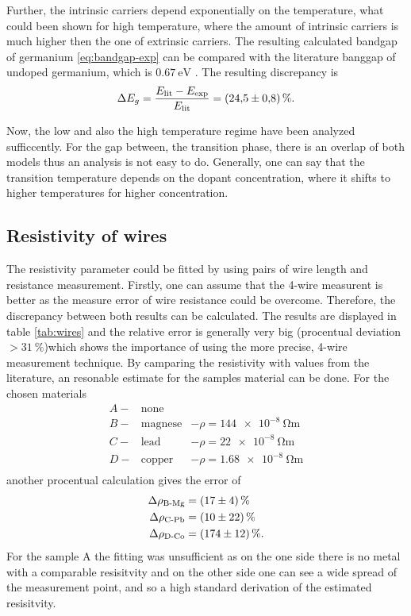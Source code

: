 Further, the intrinsic carriers depend exponentially on the temperature, what could been shown for high temperature, where the amount of intrinsic carriers is much higher then the one of extrinsic carriers.
The resulting calculated bandgap of germanium \ref{eq:bandgap-exp} can be compared with the literature banggap of undoped germanium, which is $\SI{0.67}{\eV}$ \cite{bandgap-Ge}.
The resulting discrepancy is
\begin{equation}
    \Delta E_g = \frac{E_\text{lit}-E_\text{exp}}{E_\text{lit}} = \SI{24.5 \pm 0.8}{\percent}.
\end{equation}

Now, the low and also the high temperature regime have been analyzed sufficcently. 
For the gap between, the transition phase, there is an overlap of both models thus an analysis is not easy to do.
Generally, one can say that the transition temperature depends on the dopant concentration, where it shifts to higher temperatures for higher concentration.

\subsection{Resistivity of wires}
\label{sec:wires-disc}

The resistivity parameter could be fitted by using pairs of wire length and resistance measurement.
Firstly, one can assume that the 4-wire measurent is better as the measure error of wire resistance could be overcome.
Therefore, the discrepancy between both results can be calculated.
The results are displayed in table \ref{tab:wires} and the relative error is generally very big (procentual deviation $>\SI{31}{\percent}$)which shows the importance of using the more precise, 4-wire measurement technique.
By camparing the resistivity with values from the literature, an resonable estimate for the samples material can be done.
For the chosen materials 
\begin{align*}
    A -& \text{none} &\\
    B -& \text{magnese} &-\rho=\SI{144e-8}{\ohm\meter}  \\
    C -& \text{lead} &- \rho=\SI{22e-8}{\ohm\meter} \\
    D -& \text{copper} &- \rho=\SI{1.68e-8}{\ohm\meter}  \\
\end{align*}\cite{lead}\cite{copper}
another procentual calculation gives the error of
\begin{align*}
    \Delta \rho_\text{B-Mg} &= \SI{17 \pm 4}{\percent} \\
    \Delta \rho_\text{C-Pb} &= \SI{10 \pm 22}{\percent} \\
    \Delta \rho_\text{D-Co} &= \SI{174 \pm 12}{\percent} .\\
\end{align*}
For the sample A the fitting was unsufficient as on the one side there is no metal with a comparable resisitvity and on the other side one can see a wide spread of the measurement point, and so a high standard derivation of the estimated resisitvity.
